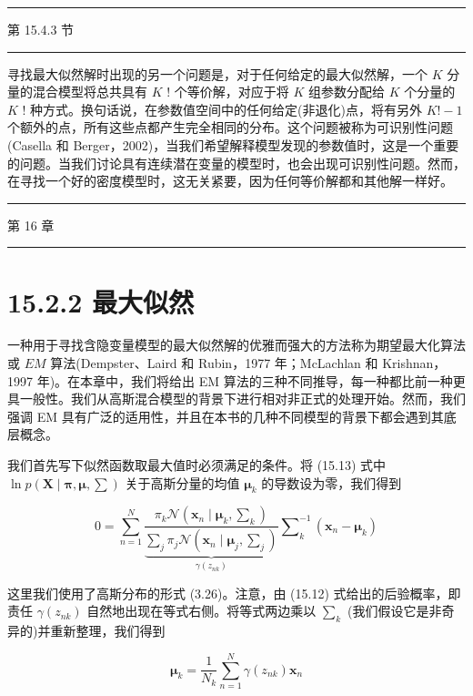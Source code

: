\documentclass[10pt]{article}
\newcommand{\HRule}{\begin{center}\rule{0.9\linewidth}{0.2mm}\end{center}}
\begin{document}
\HRule

第 15.4.3 节

\HRule

寻找最大似然解时出现的另一个问题是，对于任何给定的最大似然解，一个 \(K\) 分量的混合模型将总共具有 \(K\) ! 个等价解，对应于将 \(K\) 组参数分配给 \(K\) 个分量的 \(K\) ! 种方式。换句话说，在参数值空间中的任何给定(非退化)点，将有另外 \(K! - 1\) 个额外的点，所有这些点都产生完全相同的分布。这个问题被称为可识别性问题(Casella 和 Berger，2002)，当我们希望解释模型发现的参数值时，这是一个重要的问题。当我们讨论具有连续潜在变量的模型时，也会出现可识别性问题。然而，在寻找一个好的密度模型时，这无关紧要，因为任何等价解都和其他解一样好。

\HRule

第 16 章

\HRule

\section*{15.2.2 最大似然}

一种用于寻找含隐变量模型的最大似然解的优雅而强大的方法称为期望最大化算法或 \({EM}\) 算法(Dempster、Laird 和 Rubin，1977 年；McLachlan 和 Krishnan，1997 年)。在本章中，我们将给出 EM 算法的三种不同推导，每一种都比前一种更具一般性。我们从高斯混合模型的背景下进行相对非正式的处理开始。然而，我们强调 EM 具有广泛的适用性，并且在本书的几种不同模型的背景下都会遇到其底层概念。

我们首先写下似然函数取最大值时必须满足的条件。将 (15.13) 式中 \(\ln p\left( {\mathbf{X} \mid  \mathbf{\pi },\mathbf{\mu },\mathbf{\sum }}\right)\) 关于高斯分量的均值 \({\mathbf{\mu }}_{k}\) 的导数设为零，我们得到

\[
0 = \mathop{\sum }\limits_{{n = 1}}^{N}\frac{{\pi }_{k}\mathcal{N}\left( {{\mathbf{x}}_{n} \mid  {\mathbf{\mu }}_{k},{\mathbf{\sum }}_{k}}\right) }{\underset{\gamma \left( {z}_{nk}\right) }{\underbrace{\mathop{\sum }\limits_{j}{\pi }_{j}\mathcal{N}\left( {{\mathbf{x}}_{n} \mid  {\mathbf{\mu }}_{j},{\mathbf{\sum }}_{j}}\right) }}}{\mathbf{\sum }}_{k}^{-1}\left( {{\mathbf{x}}_{n} - {\mathbf{\mu }}_{k}}\right)  \tag{15.15}
\]

这里我们使用了高斯分布的形式 (3.26)。注意，由 (15.12) 式给出的后验概率，即责任 \(\gamma \left( {z}_{nk}\right)\) 自然地出现在等式右侧。将等式两边乘以 \({\mathbf{\sum }}_{k}\) (我们假设它是非奇异的)并重新整理，我们得到

\[
{\mathbf{\mu }}_{k} = \frac{1}{{N}_{k}}\mathop{\sum }\limits_{{n = 1}}^{N}\gamma \left( {z}_{nk}\right) {\mathbf{x}}_{n} \tag{15.16}
\]
\end{document}
